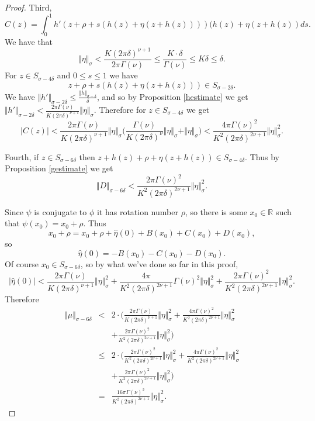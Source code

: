 \documentclass{article}
\newcommand{\norm}[1]{\Vert #1 \Vert}
\begin{document}
\begin{proof}
Third,
\[
C(z)=\int_0^1 h'(z+\rho+s(h(z)+\eta(z+h(z))))(h(z)+\eta(z+h(z))ds.
\]
We have that
\[
\norm{\eta}_\sigma < \frac{K(2\pi \delta)^{\nu+1}}{2\pi \Gamma(\nu)}
\leq \frac{K \cdot \delta}{\Gamma(\nu)}
\leq K\delta \leq\delta.
\]
For $z \in S_{\sigma-4\delta}$ and $0 \leq s \leq 1$ we have 
\[
z+\rho+s(h(z)+\eta(z+h(z))) \in S_{\sigma-2\delta}.
\]
We have
$\norm{h'}_{\sigma-2\delta} \leq \frac{\norm{h}_{\sigma-\delta}}{\delta}$, and so by Proposition \ref{hestimate} we get $\norm{h'}_{\sigma-2\delta}< \frac{2\pi \Gamma(\nu)}{K(2\pi \delta)^{\nu+1}}\norm{\eta}_{\sigma}$. Therefore for $z \in S_{\sigma-4\delta}$ we get
\[
|C(z)| <  \frac{2\pi \Gamma(\nu)}{K(2\pi \delta)^{\nu+1}}\norm{\eta}_{\sigma}
\Big(\frac{\Gamma(\nu)}{K(2\pi \delta)^\nu}\norm{\eta}_\sigma
+\norm{\eta}_\sigma \Big)
< \frac{4\pi \Gamma(\nu)^2 }{K^2 (2\pi \delta)^{2\nu+1}} \norm{\eta}_\sigma^2.
\]

Fourth, if $z \in S_{\sigma-6\delta}$ then $z+h(z)+\rho+\eta(z+h(z)) \in S_{\sigma-4\delta}$. Thus
by Proposition \ref{gestimate} we get
\[
\norm{D}_{\sigma-6\delta} <
\frac{2\pi \Gamma(\nu)^2}{K^2(2\pi \delta)^{2\nu+1}}\norm{\eta}_\sigma^2.
\]

Since $\psi$ is conjugate to $\phi$ it has rotation number $\rho$, so there is some $x_0 \in \mathbb{R}$ such that $\psi(x_0)=x_0+\rho$. Thus 
\[
x_0+\rho=x_0+\rho+\widehat{\eta}(0)+B(x_0)+C(x_0)+D(x_0),
\]
so
\[
\widehat{\eta}(0)=-B(x_0)-C(x_0)-D(x_0).
\]
Of course $x_0 \in S_{\sigma-6\delta}$, so by what we've done so far in this proof,
\[
|\widehat{\eta}(0)| <
\frac{2\pi \Gamma(\nu)}{K(2\pi\delta)^{\nu+1}}\norm{\eta}_\sigma^2
+
\frac{4\pi}{K^2 (2\pi \delta)^{2\nu+1}} \Gamma(\nu)^2 \norm{\eta}_\sigma^2
+
\frac{2\pi \Gamma(\nu)^2}{K^2(2\pi \delta)^{2\nu+1}}\norm{\eta}_\sigma^2.
\]
Therefore
\begin{eqnarray*}
\norm{\mu}_{\sigma-6\delta}
&<&2\cdot\Big(\frac{2\pi \Gamma(\nu)}{K(2\pi\delta)^{\nu+1}}\norm{\eta}_\sigma^2
+
\frac{4\pi \Gamma(\nu)^2 }{K^2 (2\pi \delta)^{2\nu+1}} \norm{\eta}_\sigma^2\\
&&+
\frac{2\pi \Gamma(\nu)^2}{K^2(2\pi \delta)^{2\nu+1}}\norm{\eta}_\sigma^2\Big)\\
&\leq&2\cdot\Big( \frac{2\pi \Gamma(\nu)^2}{K^2 (2\pi \delta)^{2\nu+1}} \norm{\eta}_\sigma^2
+\frac{4\pi \Gamma(\nu)^2}{K^2(2\pi \delta)^{2\nu+1}}\norm{\eta}_\sigma^2\\
&&+\frac{2\pi \Gamma(\nu)^2}{K^2(2\pi \delta)^{2\nu+1}}\norm{\eta}_\sigma^2\Big)\\
&=&\frac{16\pi \Gamma(\nu)^2}{K^2(2\pi \delta)^{2\nu+1}} \norm{\eta}_\sigma^2.
\end{eqnarray*}
\end{proof}
\end{document}
